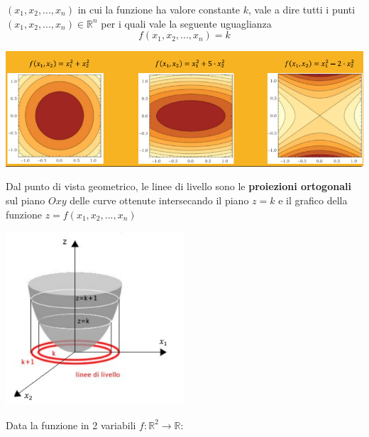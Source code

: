 \documentclass[12pt]{article}
\begin{document}
$(x_1, x_2, ..., x_n)$ in cui la funzione ha valore constante $k$, vale a dire tutti i punti $(x_1, x_2, ..., x_n) \in \mathbb{R}^n$ per i quali vale la seguente uguaglianza
$$f(x_1, x_2, ..., x_n) = k$$
\begin{center}
    \includegraphics[width = 1\textwidth]{Images/3.PNG}
\end{center}
Dal punto di vista geometrico, le linee di livello sono le \textbf{proiezioni ortogonali} sul piano $Oxy$ delle curve ottenute
intersecando il piano $z=k$ e il grafico della funzione $z = f(x_1, x_2, ..., x_n)$
\begin{center}
    \includegraphics[width = 0.50\textwidth]{Images/4.PNG}
\end{center}
Data la funzione in 2 variabili $f: \mathbb{R}^2 \rightarrow \mathbb{R}$:
\end{document}
